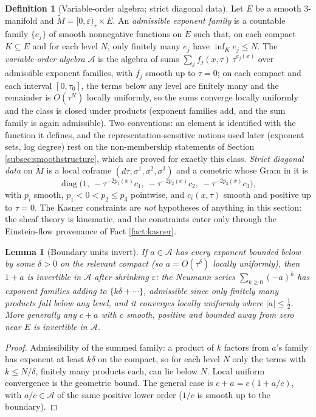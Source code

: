 \documentclass[11pt]{article}
\newtheorem{lemma}[theorem]{Lemma}
\theoremstyle{definition}
\newtheorem{definition}[theorem]{Definition}
\newcommand{\Mt}{\widetilde{M}}
\begin{document}
\begin{definition}[Variable-order algebra; strict diagonal data]\label{def:varorder}
Let $E$ be a smooth $3$-manifold and $\Mt = [0,\varepsilon)_\tau \times E$. An \emph{admissible exponent family} is a countable family $\{e_j\}$ of smooth nonnegative functions on $E$ such that, on each compact $K \subseteq E$ and for each level $N$, only finitely many $e_j$ have $\inf_K e_j \leq N$. The \emph{variable-order algebra} $\mathcal{A}$ is the algebra of sums $\sum_j f_j(x,\tau)\,\tau^{e_j(x)}$ over admissible exponent families, with $f_j$ smooth up to $\tau = 0$; on each compact and each interval $[0, \tau_0]$, the terms below any level are finitely many and the remainder is $O(\tau^{N})$ locally uniformly, so the sums converge locally uniformly and the class is closed under products (exponent families add, and the sum family is again admissible). Two conventions: an element is identified with the function it defines, and the representation-sensitive notions used later (exponent sets, log degree) rest on the non-membership statements of Section \ref{subsec:smoothstructure}, which are proved for exactly this class. \emph{Strict diagonal data} on $\Mt$ is a local coframe $(d\tau, \sigma^1, \sigma^2, \sigma^3)$ and a cometric whose Gram in it is
\[
\operatorname{diag}\bigl(1,\ -\tau^{-2p_1(x)}c_1,\ -\tau^{-2p_2(x)}c_2,\ -\tau^{-2p_3(x)}c_3\bigr),
\]
with $p_i$ smooth, $p_1 < 0 < p_2 \leq p_3$ pointwise, and $c_i(x,\tau)$ smooth and positive up to $\tau = 0$. The Kasner constraints are \emph{not} hypotheses of anything in this section: the sheaf theory is kinematic, and the constraints enter only through the Einstein-flow provenance of Fact \ref{fact:kasner}.
\end{definition}

\begin{lemma}[Boundary units invert]\label{lem:units}
If $a \in \mathcal{A}$ has every exponent bounded below by some $\delta > 0$ on the relevant compact (so $a = O(\tau^\delta)$ locally uniformly), then $1 + a$ is invertible in $\mathcal{A}$ after shrinking $\varepsilon$: the Neumann series $\sum_{k \geq 0} (-a)^k$ has exponent families adding to $\{k\delta + \cdots\}$, admissible since only finitely many products fall below any level, and it converges locally uniformly where $|a| \leq \tfrac12$. More generally any $c + a$ with $c$ smooth, positive and bounded away from zero near $E$ is invertible in $\mathcal{A}$.
\end{lemma}

\begin{proof}
Admissibility of the summed family: a product of $k$ factors from $a$'s family has exponent at least $k\delta$ on the compact, so for each level $N$ only the terms with $k \leq N/\delta$, finitely many products each, can lie below $N$. Local uniform convergence is the geometric bound. The general case is $c + a = c(1 + a/c)$, with $a/c \in \mathcal{A}$ of the same positive lower order ($1/c$ is smooth up to the boundary).
\end{proof}
\end{document}
